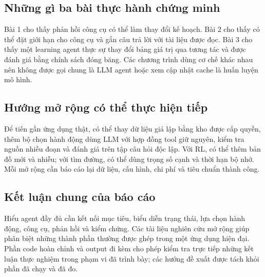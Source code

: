 \subsection{Những gì ba bài thực hành chứng minh}
Bài 1 cho thấy phản hồi công cụ có thể làm thay đổi kế hoạch. Bài 2 cho thấy có thể
đặt giới hạn cho công cụ và gắn câu trả lời với tài liệu được đọc. Bài 3 cho thấy
một learning agent thực sự thay đổi bảng giá trị qua tương tác và được đánh giá
bằng chính sách đóng băng. Các chương trình dùng cơ chế khác nhau nên không được
gọi chung là LLM agent hoặc xem cập nhật cache là huấn luyện mô hình.

\subsection{Hướng mở rộng có thể thực hiện tiếp}
Để tiến gần ứng dụng thật, có thể thay dữ liệu giả lập bằng kho được cấp quyền,
thêm bộ chọn hành động dùng LLM với hợp đồng tool giữ nguyên, kiểm tra nguồn nhiều
đoạn và đánh giá trên tập câu hỏi độc lập. Với RL, có thể thêm bản đồ mới và nhiễu;
với tìm đường, có thể dùng trọng số cạnh và thời hạn bộ nhớ. Mỗi mở rộng cần báo
cáo lại dữ liệu, cấu hình, chi phí và tiêu chuẩn thành công.

\subsection{Kết luận chung của báo cáo}
Hiểu agent đầy đủ cần kết nối mục tiêu, biểu diễn trạng thái, lựa chọn hành động,
công cụ, phản hồi và kiểm chứng. Các tài liệu nghiên cứu mở rộng giúp phân biệt
những thành phần thường được ghép trong một ứng dụng hiện đại. Phần code hoàn chỉnh
và output đi kèm cho phép kiểm tra trực tiếp những kết luận thực nghiệm trong phạm
vi đã trình bày; các hướng đề xuất được tách khỏi phần đã chạy và đã đo.
